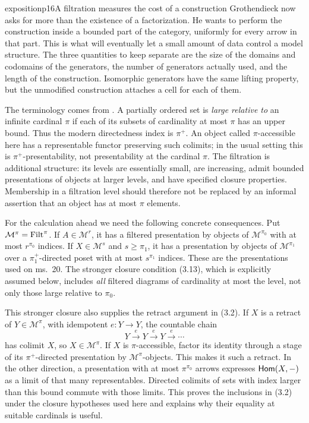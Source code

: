 \begin{dcomment}{exposition}{p16}{A filtration measures the cost of a construction}
Grothendieck now asks for more than the existence of a factorization. He wants to perform the construction inside a bounded part of the category, uniformly for every arrow in that part. This is what will eventually let a small amount of data control a model structure. The three quantities to keep separate are the size of the domains and codomains of the generators, the number of generators actually used, and the length of the construction. Isomorphic generators have the same lifting property, but the unmodified construction attaches a cell for each of them.

The terminology comes from \citet[Expos\'e I, Definitions 9.1--9.3 and 9.12]{SGA4I1972}. A partially ordered set is \emph{large relative to} an infinite cardinal $\pi$ if each of its subsets of cardinality at most $\pi$ has an upper bound. Thus the modern directedness index is $\pi^+$. An object called $\pi$-accessible here has a representable functor preserving such colimits; in the usual setting this is $\pi^+$-presentability, not presentability at the cardinal $\pi$. The filtration is additional structure: its levels are essentially small, are increasing, admit bounded presentations of objects at larger levels, and have specified closure properties. Membership in a filtration level should therefore not be replaced by an informal assertion that an object has at most $\pi$ elements.

For the calculation ahead we need the following concrete consequences. Put $\mathcal M^\pi=\mathrm{Filt}^\pi$. If $A\in\mathcal M^r$, it has a filtered presentation by objects of $\mathcal M^{\pi_0}$ with at most $r^{\pi_0}$ indices. If $X\in\mathcal M^s$ and $s\geq\pi_1$, it has a presentation by objects of $\mathcal M^{\pi_1}$ over a $\pi_1^+$-directed poset with at most $s^{\pi_1}$ indices. These are the presentations used on ms.~20. The stronger closure condition (3.13), which is explicitly assumed below, includes \emph{all} filtered diagrams of cardinality at most the level, not only those large relative to $\pi_0$.

This stronger closure also supplies the retract argument in (3.2). If $X$ is a retract of $Y\in\mathcal M^\pi$, with idempotent $e:Y\to Y$, the countable chain
\[
Y\xrightarrow{e}Y\xrightarrow{e}Y\xrightarrow{e}\cdots
\]
has colimit $X$, so $X\in\mathcal M^\pi$. If $X$ is $\pi$-accessible, factor its identity through a stage of its $\pi^+$-directed presentation by $\mathcal M^\pi$-objects. This makes it such a retract. In the other direction, a presentation with at most $\pi^{\pi_0}$ arrows expresses $\mathsf{Hom}(X,-)$ as a limit of that many representables. Directed colimits of sets with index larger than this bound commute with those limits. This proves the inclusions in (3.2) under the closure hypotheses used here and explains why their equality at suitable cardinals is useful.
\end{dcomment}


